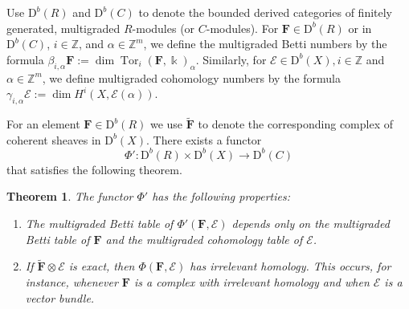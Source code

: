 \documentclass[12pt]{amsart}
\newtheorem{theorem}[lemma]{Theorem}
\theoremstyle{definition}
\theoremstyle{remark}
\newcommand{\Tor}{\operatorname{Tor}}
\newcommand{\kk}{\Bbbk}
\newcommand{\ZZ}{\mathbb{Z}}
\newcommand{\cE}{\mathcal{E}}
\newcommand{\FF}{\mathbf{F}}
\newcommand{\DD}{\mathrm{D}}
\begin{document}
Use $\DD^b(R)$ and $\DD^b(C)$ to denote the bounded derived categories of finitely generated, multigraded $R$-modules (or $C$-modules).   For $\FF\in \DD^b(R)$ or in $\DD^b(C)$, $i\in \ZZ$, and $\alpha\in \ZZ^m$, we define the multigraded Betti numbers by the formula $\beta_{i,\alpha} \FF:=\dim \Tor_i(\FF,\kk)_{\alpha}$.  Similarly, for $\cE\in \DD^b(X), i\in \ZZ$ and $\alpha\in \ZZ^m$, we define multigraded cohomology numbers by the formula $\gamma_{i,\alpha} \cE:=\dim H^i(X, \cE(\alpha))$.  


For an element $\FF\in \DD^b(R)$ we use $\widetilde{\FF}$ to denote the corresponding complex of coherent sheaves in $\DD^b(X)$.  There exists a functor
\[
\Phi': \DD^b(R)\times \DD^b(X)\to \DD^b(C)
\]
that satisfies the following theorem.
\begin{theorem}\label{thm:Phimulti}
The functor $\Phi'$ has the following  properties:
\begin{enumerate}
	\item\label{thm:Phi':1}  The multigraded Betti table of $\Phi'(\FF,\cE)$ depends only on the multigraded Betti table of $\FF$ and the multigraded cohomology table of $\cE$.
	\item\label{thm:Phi':2}  If $\widetilde{\FF}\otimes \cE$ is exact, then $\Phi(\FF,\cE)$ has irrelevant homology.  This occurs, for instance, whenever $\FF$ is a complex with irrelevant homology and when $\cE$ is a vector bundle.
\end{enumerate}
\end{theorem}
\end{document}
